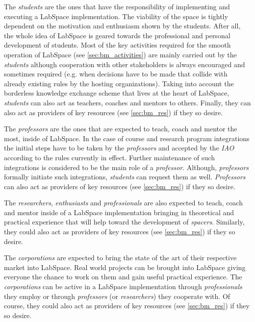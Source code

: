 \documentclass[a4paper, 11pt]{article}
\begin{document}
The \textit{students} are the ones that have the responsibility of implementing and executing a LabSpace implementation. The viability of the space is tightly dependent on the motivation and enthusiasm shown by the students. After all, the whole idea of LabSpace is geared towards the professional and personal development of students. Most of the key activities required for the smooth operation of LabSpace (see \ref{sec:bm_activities}) are mainly carried out by the \textit{students} although cooperation with other stakeholders is always encouraged and sometimes required (e.g. when decisions have to be made that collide with already existing rules by the hosting organizations). Taking into account the borderless knowledge exchange scheme that lives at the heart of LabSpace, \textit{students} can also act as teachers, coaches and mentors to others. Finally, they can also act as providers of key resources (see \ref{sec:bm_res}) if they so desire.

The \textit{professors} are the ones that are expected to teach, coach and mentor the most, inside of LabSpace. In the case of course and research program integrations the initial steps have to be taken by the \textit{professors} and accepted by the \textit{IAO} according to the rules currently in effect. Further maintenance of such integrations is considered to be the main role of a \textit{professor}. Although, \textit{professors} formally initiate such integrations, \textit{students} can request them as well. \textit{Professors} can also act as providers of key resources (see \ref{sec:bm_res}) if they so desire.

The \textit{researchers}, \textit{enthusiasts} and \textit{professionals} are also expected to teach, coach and mentor inside of a LabSpace implementation bringing in theoretical and practical experience that will help toward the development of \textit{spacers}. Similarly, they could also act as providers of key resources (see \ref{sec:bm_res}) if they so desire.

The \textit{corporations} are expected to bring the state of the art of their respective market into LabSpace. Real world projects can be brought into LabSpace giving everyone the chance to work on them and gain useful practical experience. The \textit{corporations} can be active in a LabSpace implementation through \textit{professionals} they employ or through \textit{professors} (or \textit{researchers}) they cooperate with. Of course, they could also act as providers of key resources (see \ref{sec:bm_res}) if they so desire.
\end{document}
